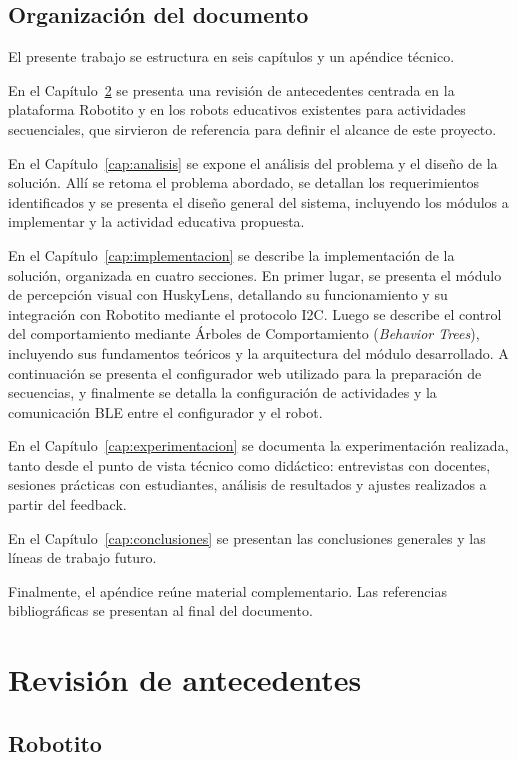 \documentclass{prgrado}
\begin{document}
\section{Organización del documento}

El presente trabajo se estructura en seis capítulos y un apéndice técnico.

En el Capítulo~\ref{cap:antecedentes} se presenta una revisión de
antecedentes centrada en la plataforma Robotito y en los robots educativos
existentes para actividades secuenciales, que sirvieron de referencia para
definir el alcance de este proyecto.

En el Capítulo~\ref{cap:analisis} se expone el análisis del problema y el
diseño de la solución. Allí se retoma el problema abordado, se detallan los
requerimientos identificados y se presenta el diseño general del sistema,
incluyendo los módulos a implementar y la actividad educativa propuesta.

En el Capítulo~\ref{cap:implementacion} se describe la implementación de la
solución, organizada en cuatro secciones. En primer lugar, se presenta el
módulo de percepción visual con HuskyLens, detallando su funcionamiento y su
integración con Robotito mediante el protocolo I2C. Luego se describe el
control del comportamiento mediante Árboles de Comportamiento (\textit{Behavior
Trees}), incluyendo sus fundamentos teóricos y la arquitectura del módulo
desarrollado. A continuación se presenta el configurador web utilizado para
la preparación de secuencias, y finalmente se detalla la configuración de
actividades y la comunicación BLE entre el configurador y el robot.

En el Capítulo~\ref{cap:experimentacion} se documenta la experimentación
realizada, tanto desde el punto de vista técnico como didáctico:
entrevistas con docentes, sesiones prácticas con estudiantes, análisis de
resultados y ajustes realizados a partir del feedback.

En el Capítulo~\ref{cap:conclusiones} se presentan las conclusiones
generales y las líneas de trabajo futuro.

Finalmente, el apéndice reúne material complementario. 
Las referencias bibliográficas se presentan al final del documento.
\chapter{Revisión de antecedentes}
\label{cap:antecedentes}

\section{Robotito}
\end{document}
